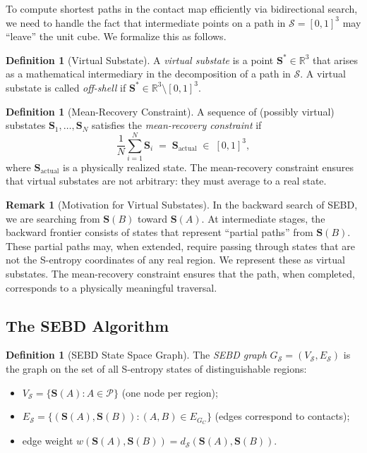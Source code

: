 \documentclass[twocolumn]{article}
\theoremstyle{plain}
\theoremstyle{definition}
\newtheorem{definition}[theorem]{Definition}
\newtheorem{remark}[theorem]{Remark}
\newcommand{\PP}{\mathcal{P}}
\newcommand{\ScS}{\mathcal{S}}
\newcommand{\bS}{\mathbf{S}}
\newcommand{\dS}{d_{\mathcal{S}}}
\newcommand{\reals}{\mathbb{R}}
\begin{document}
To compute shortest paths in the contact map efficiently via bidirectional search,
we need to handle the fact that intermediate points on a path in $\ScS = [0,1]^3$
may ``leave'' the unit cube. We formalize this as follows.

\begin{definition}[Virtual Substate]
\label{def:virtualsubstate}
A \emph{virtual substate} is a point $\bS^* \in \reals^3$ that arises as a
mathematical intermediary in the decomposition of a path in $\ScS$. A virtual
substate is called \emph{off-shell} if $\bS^* \in \reals^3 \setminus [0,1]^3$.
\end{definition}

\begin{definition}[Mean-Recovery Constraint]
\label{def:meanrecovery}
A sequence of (possibly virtual) substates $\bS_1, \ldots, \bS_N$ satisfies the
\emph{mean-recovery constraint} if
\[
  \frac{1}{N} \sum_{i=1}^N \bS_i \;=\; \bS_{\text{actual}} \;\in\; [0,1]^3,
\]
where $\bS_{\text{actual}}$ is a physically realized state. The mean-recovery
constraint ensures that virtual substates are not arbitrary: they must average to
a real state.
\end{definition}

\begin{remark}[Motivation for Virtual Substates]
In the backward search of SEBD, we are searching from $\bS(B)$ toward $\bS(A)$.
At intermediate stages, the backward frontier consists of states that represent
``partial paths'' from $\bS(B)$. These partial paths may, when extended, require
passing through states that are not the S-entropy coordinates of any real region.
We represent these as virtual substates. The mean-recovery constraint ensures
that the path, when completed, corresponds to a physically meaningful traversal.
\end{remark}

\subsection{The SEBD Algorithm}

\begin{definition}[SEBD State Space Graph]
\label{def:sebdgraph}
The \emph{SEBD graph} $G_{\ScS} = (V_\ScS, E_\ScS)$ is the graph on the set of
all S-entropy states of distinguishable regions:
\begin{itemize}
\item $V_\ScS = \{\bS(A) : A \in \PP\}$ (one node per region);
\item $E_\ScS = \{(\bS(A), \bS(B)) : (A,B) \in E_{G_C}\}$ (edges correspond to contacts);
\item edge weight $w(\bS(A), \bS(B)) = \dS(\bS(A), \bS(B))$.
\end{itemize}
\end{definition}
\end{document}
